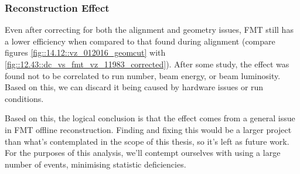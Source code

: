 \subsubsection{Reconstruction Effect}
\label{14.13::reconstruction_effect}
    Even after correcting for both the alignment and geometry issues, FMT still has a lower efficiency when compared to that found during alignment (compare figures \ref{fig::14.12::vz_012016_geomcut} with \ref{fig::12.43::dc_vs_fmt_vz_11983_corrected}).
    After some study, the effect was found not to be correlated to run number, beam energy, or beam luminosity.
    Based on this, we can discard it being caused by hardware issues or run conditions.

    Based on this, the logical conclusion is that the effect comes from a general issue in FMT offline reconstruction.
    Finding and fixing this would be a larger project than what's contemplated in the scope of this thesis, so it's left as future work.
    For the purposes of this analysis, we'll contempt ourselves with using a large number of events, minimising statistic deficiencies.
